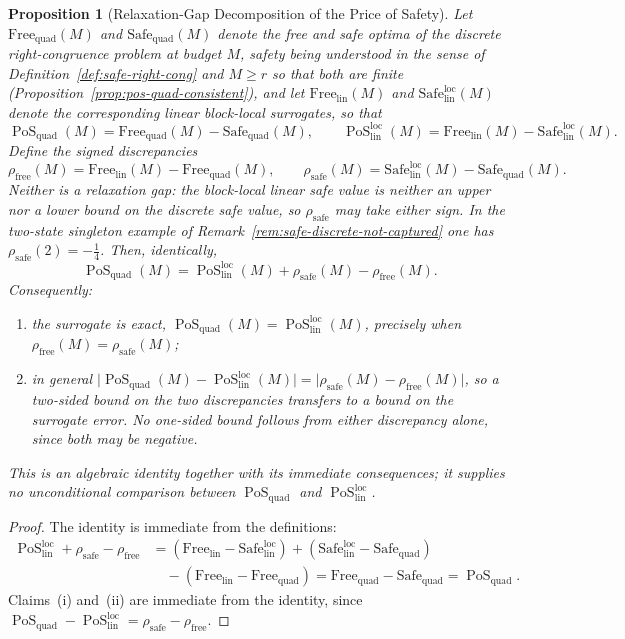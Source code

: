 \documentclass[12pt]{article}
\newtheorem{proposition}[theorem]{Proposition}
\theoremstyle{definition}
\DeclareMathOperator{\PoS}{PoS}
\newcommand{\PoSlin}{\PoS_{\mathrm{lin}}^{\mathrm{loc}}}
\newcommand{\PoSquad}{\PoS_{\mathrm{quad}}}
\begin{document}
\begin{proposition}[Relaxation-Gap Decomposition of the Price of Safety]
\label{prop:pos-relaxation-identity}
Let $\mathrm{Free}_{\mathrm{quad}}(M)$ and $\mathrm{Safe}_{\mathrm{quad}}(M)$ denote the free and safe optima of the
discrete right-congruence problem at budget $M$, safety being understood in the
sense of Definition~\ref{def:safe-right-cong} and $M\ge r$ so that both are
finite (Proposition~\ref{prop:pos-quad-consistent}), and let $\mathrm{Free}_{\mathrm{lin}}(M)$ and
$\mathrm{Safe}_{\mathrm{lin}}^{\mathrm{loc}}(M)$ denote the corresponding linear block-local surrogates, so that
\[
\PoSquad(M)=\mathrm{Free}_{\mathrm{quad}}(M)-\mathrm{Safe}_{\mathrm{quad}}(M),
\qquad
\PoSlin(M)=\mathrm{Free}_{\mathrm{lin}}(M)-\mathrm{Safe}_{\mathrm{lin}}^{\mathrm{loc}}(M).
\]
Define the \emph{signed discrepancies}
\[
\rho_{\mathrm{free}}(M)=\mathrm{Free}_{\mathrm{lin}}(M)-\mathrm{Free}_{\mathrm{quad}}(M),
\qquad
\rho_{\mathrm{safe}}(M)=\mathrm{Safe}_{\mathrm{lin}}^{\mathrm{loc}}(M)-\mathrm{Safe}_{\mathrm{quad}}(M).
\]
Neither is a relaxation gap: the block-local linear safe value is neither an
upper nor a lower bound on the discrete safe value, so $\rho_{\mathrm{safe}}$
may take either sign.  In the two-state singleton example of
Remark~\ref{rem:safe-discrete-not-captured} one has $\rho_{\mathrm{safe}}(2)=-\tfrac14$.
Then, identically,
\[
\PoSquad(M)
=
\PoSlin(M)
+
\rho_{\mathrm{safe}}(M)
-
\rho_{\mathrm{free}}(M).
\]
Consequently:
\begin{enumerate}[label=(\roman*)]
\item the surrogate is exact, $\PoSquad(M)=\PoSlin(M)$, precisely when
$\rho_{\mathrm{free}}(M)=\rho_{\mathrm{safe}}(M)$;
\item in general
$\bigl|\PoSquad(M)-\PoSlin(M)\bigr|=\bigl|\rho_{\mathrm{safe}}(M)-\rho_{\mathrm{free}}(M)\bigr|$,
so a two-sided bound on the two discrepancies transfers to a bound on the
surrogate error.  No one-sided bound follows from either discrepancy alone,
since both may be negative.
\end{enumerate}
This is an algebraic identity together with its immediate consequences; it
supplies no unconditional comparison between $\PoSquad$ and $\PoSlin$.
\end{proposition}

\begin{proof}
The identity is immediate from the definitions:
\[
\begin{aligned}
\PoSlin+\rho_{\mathrm{safe}}-\rho_{\mathrm{free}}
&=(\mathrm{Free}_{\mathrm{lin}}-\mathrm{Safe}_{\mathrm{lin}}^{\mathrm{loc}})
+(\mathrm{Safe}_{\mathrm{lin}}^{\mathrm{loc}}-\mathrm{Safe}_{\mathrm{quad}})\\
&\quad-(\mathrm{Free}_{\mathrm{lin}}-\mathrm{Free}_{\mathrm{quad}})
=\mathrm{Free}_{\mathrm{quad}}-\mathrm{Safe}_{\mathrm{quad}}
=\PoSquad .
\end{aligned}
\]
Claims~(i) and~(ii) are immediate from the identity, since
$\PoSquad-\PoSlin=\rho_{\mathrm{safe}}-\rho_{\mathrm{free}}$.
\end{proof}
\end{document}
